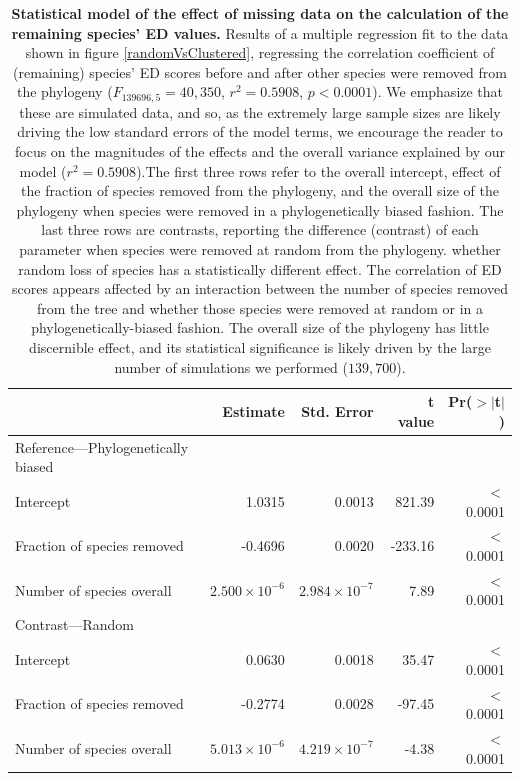\documentclass[10pt,english]{article}
\begin{document}
\begin{table}[ht]
  \centering
  \begin{tabular}{lrrrr}
    \hline
    & Estimate & Std. Error & t value & Pr($>$$|$t$|$) \\ \hline
    Reference---Phylogenetically biased\\
    Intercept & 1.0315 & 0.0013 & 821.39 & $<$0.0001 \\
    Fraction of species removed & -0.4696 & 0.0020 & -233.16 & $<$0.0001 \\
    Number of species overall & $2.500 \times 10^{-6}$ & $2.984 \times 10^{-7}$ & 7.89 & $<$0.0001 \\
    Contrast---Random\\
    Intercept & 0.0630 & 0.0018 & 35.47 & $<$0.0001 \\
    Fraction of species removed & -0.2774 & 0.0028 & -97.45 & $<$0.0001 \\
    Number of species overall & $5.013 \times 10^{-6}$ & $4.219 \times 10^{-7}$ & -4.38 & $<$0.0001 \\ \hline
  \end{tabular}
  \caption{\textbf{Statistical model of the effect of missing data on the
      calculation of the remaining species' ED values.} Results of a multiple
      regression fit to the data shown in figure \ref{randomVsClustered},
      regressing the correlation coefficient of (remaining) species' ED scores
      before and after other species were removed from the phylogeny
      ($F_{139696,5} = 40,350$, $r^{2} = 0.5908$, $p < 0.0001$). We emphasize
      that these are simulated data, and so, as the extremely large sample sizes
      are likely driving the low standard errors of the model terms, we
      encourage the reader to focus on the magnitudes of the effects and the
      overall variance explained by our model ($r^{2} = 0.5908$).The first three
      rows refer to the overall intercept, effect of the fraction of species
      removed from the phylogeny, and the overall size of the phylogeny when
      species were removed in a phylogenetically biased fashion. The last three
      rows are contrasts, reporting the difference (contrast) of each parameter
      when species were removed at random from the phylogeny. whether random
      loss of species has a statistically different effect. The correlation of
      ED scores appears affected by an interaction between the number of species
      removed from the tree and whether those species were removed at random or
      in a phylogenetically-biased fashion. The overall size of the phylogeny
      has little discernible effect, and its statistical significance is likely
      driven by the large number of simulations we performed ($139,700$).}
\label{missing_regression}
\end{table}
\end{document}
